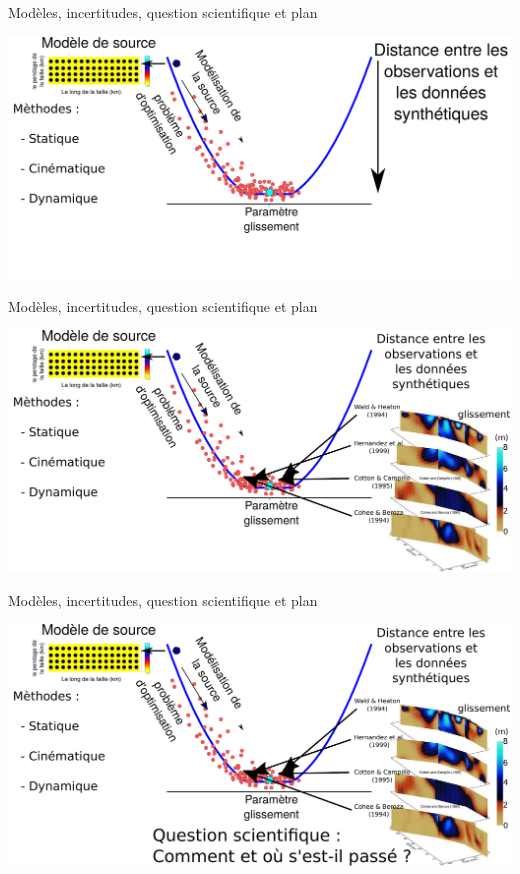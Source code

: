 \documentclass{beamer}
\begin{document}
\begin{frame}
 {Modèles, incertitudes, question scientifique et plan}

 \includegraphics[width=1\linewidth]{images/uncertainty_1-2.pdf}
 \addtocounter{framenumber}{-1}
 
\end{frame}


\begin{frame}
 {Modèles, incertitudes, question scientifique et plan}

 \vskip 0cm
 \includegraphics[width=1\linewidth]{images/uncertainty_2.pdf}
 \addtocounter{framenumber}{-1}
 
\end{frame}

\begin{frame}
 {Modèles, incertitudes, question scientifique et plan}

 \vskip 0cm
 \includegraphics[width=1\linewidth]{images/uncertainty_2-2.pdf}
 \addtocounter{framenumber}{-1}
 
\end{frame}
\end{document}
